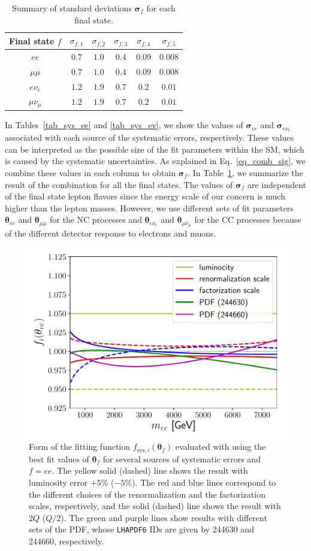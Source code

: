 \documentclass[12pt,twoside,book]{article}
\begin{document}
\begin{table}[t]
  \centering
  \begin{tabular}{c|ccccc}
    Final state $f$ & $\sigma_{f,1}$ & $\sigma_{f,2}$ & $\sigma_{f,3}$ & $\sigma_{f,4}$ & $\sigma_{f,5}$ \\ \hline
    $ee$ & $0.7$ & $1.0$ & $0.4$ & $0.09$ & $0.008$ \\
    $\mu\mu$ & $0.7$ & $1.0$ & $0.4$ & $0.09$ & $0.008$ \\
    $e\nu_e$ & $1.2$ & $1.9$ & $0.7$ & $0.2$ & $0.01$ \\
    $\mu\nu_\mu$ & $1.2$ & $1.9$ & $0.7$ & $0.2$ & $0.01$ \\
  \end{tabular}
  \caption{
    Summary of standard deviations $\bm{\sigma}_f$ for each final state.
  }
  \label{tab_sys}
\end{table}

In Tables~\ref{tab_sys_ee} and \ref{tab_sys_ev}, we show the values of $\bm{\sigma}_{ee}$ and $\bm{\sigma}_{e\nu_e}$ associated with each source of the systematic errors, respectively.
These values can be interpreted as the possible size of the fit parameters within the SM, which is caused by the systematic uncertainties.
As explained in Eq.~\eqref{eq_comb_sig}, we combine these values in each column to obtain $\bm{\sigma}_f$.
In Table~\ref{tab_sys}, we summarize the result of the combination for all the final states.
The values of $\bm{\sigma}_f$ are independent of the final state lepton flavors since the energy scale of our concern is much higher than the lepton masses.
However, we use different sets of fit parameters $\bm{\theta}_{ee}$ and $\bm{\theta}_{\mu\mu}$ for the NC processes and $\bm{\theta}_{e\nu_e}$ and $\bm{\theta}_{\mu\nu_\mu}$ for the CC processes because of the different detector response to electrons and muons.

\begin{figure}[t]
  \centering
  \includegraphics[width=0.5\hsize]{systematic.pdf}
  \caption{
    Form of the fitting function $f_{\mathrm{sys},i} (\bm{\theta}_f)$ evaluated with using the best fit values of $\bm{\theta}_f$ for several sources of systematic errors and $f=ee$.
    The yellow solid (dashed) line shows the result with luminosity error $+5\%$ ($-5\%$).
    The red and blue lines correspond to the different choices of the renormalization and the factorization scales, respectively, and the solid (dashed) line shows the result with $2Q$ ($Q/2$).
    The green and purple lines show results with different sets of the PDF, whose \texttt{LHAPDF6} IDs are given by 244630 and 244660, respectively.
  }
  \label{fig:systematic}
\end{figure}
\end{document}
